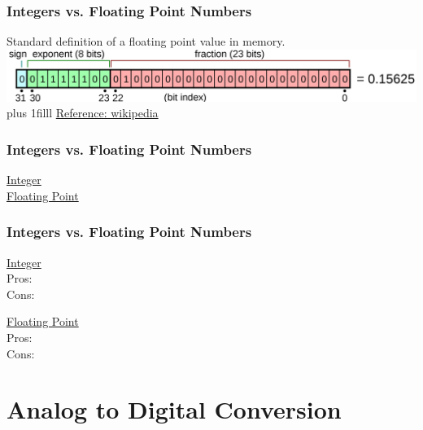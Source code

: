 \documentclass[fleqn]{beamer} %
\newcommand{\sectiontitleIII}{Integers vs. Floating Point Numbers}
\newcommand{\sectiontitleIV}{Analog to Digital Conversion}
\newcommand{\btVFill}{\vskip0pt plus 1filll}
\begin{document}
\begin{frame}[label=sectionIII] \small
 
  \frametitle{\sectiontitleIII}
  
  Standard definition of a floating point value in memory.\\	
  \includegraphics[scale=.10]{ieee754_bits.png}	
  \btVFill
	\href{https://en.wikipedia.org/wiki/IEEE_754}{Reference: wikipedia}
 
\end{frame}
	
\begin{frame}[label=sectionIII] \small
\frametitle{\sectiontitleIII}
\begin{multicols}{2}
	\underline{Integer} \vspace{20mm}\\
	
	\underline{Floating Point} \vspace{20mm}\\
	
\end{multicols}
\end{frame}

\begin{frame}[label=sectionIII] \small
\frametitle{\sectiontitleIII}
\begin{multicols}{2}
\underline{Integer} \vspace{20mm}\\
Pros:\vspace{10mm}\\
Cons:

\underline{Floating Point} \vspace{20mm}\\	
Pros:\vspace{10mm}\\
Cons:
\end{multicols}
\end{frame}


\section{\sectiontitleIV}	
\end{document}
